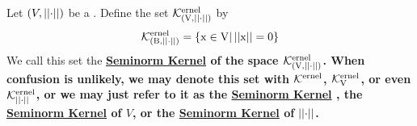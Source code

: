 \label{def:seminormkernel}
\newcommand{\SeminormKernel}[0]{
    \bf \hyperref[def:seminormkernel]{Seminorm Kernel} \rm
}

\newcommand{\Ker}[0]{
   \bf\mathcal{K}\rm^{ernel}
}


\begin{df}
Let $(V, \left|\left| \cdot \right|\right|)$ be a \SeminormedSpace. 
Define the set $\Ker_{(V,\norm{\cdot})}$ by 
\begin{equation}
\Ker_{(B,\norm{\cdot})}=\{x \in V | \norm{x}=0\}
\end{equation}
We call this set the \SeminormKernel of the space $\Ker_{(V,\norm{\cdot})}$. 
When confusion is unlikely, we may denote this set with
$\Ker$, $\Ker_V$, or even $\Ker_{\norm{\cdot}}$, or we may just refer to it
as the \SeminormKernel, the \SeminormKernel of $V$, or the \SeminormKernel of $\left|\left| \cdot \right|\right|$. 
\end{df}
